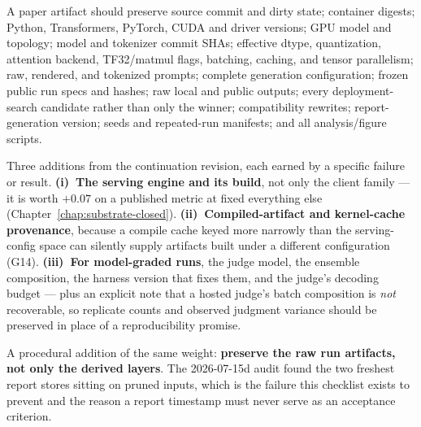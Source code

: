 \documentclass[11pt]{report}
\begin{document}
A paper artifact should preserve source commit and dirty state; container digests;
Python, Transformers, PyTorch, CUDA and driver versions; GPU model and topology;
model and tokenizer commit SHAs; effective dtype, quantization, attention backend,
TF32/matmul flags, batching, caching, and tensor parallelism; raw, rendered, and
tokenized prompts; complete generation configuration; frozen public run specs and
hashes; raw local and public outputs; every deployment-search candidate rather than
only the winner; compatibility rewrites; report-generation version; seeds and
repeated-run manifests; and all analysis/figure scripts.

\noindent Three additions from the continuation revision, each earned by a specific
failure or result. \textbf{(i)~The serving engine and its build}, not only the
client family --- it is worth $+0.07$ on a published metric at fixed everything else
(Chapter~\ref{chap:substrate-closed}). \textbf{(ii)~Compiled-artifact and
kernel-cache provenance}, because a compile cache keyed more narrowly than the
serving-config space can silently supply artifacts built under a different
configuration (G14). \textbf{(iii)~For model-graded runs}, the judge model, the
ensemble composition, the harness version that fixes them, and the judge's decoding
budget --- plus an explicit note that a hosted judge's batch composition is
\emph{not} recoverable, so replicate counts and observed judgment variance should be
preserved in place of a reproducibility promise.

\noindent A procedural addition of the same weight: \textbf{preserve the raw run
artifacts, not only the derived layers}. The 2026-07-15d audit found the two
freshest report stores sitting on pruned inputs, which is the failure this checklist
exists to prevent and the reason a report timestamp must never serve as an
acceptance criterion.

\end{document}
